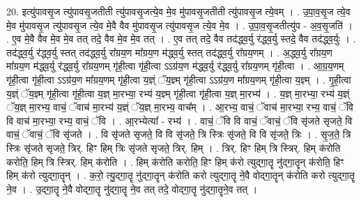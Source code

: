 \documentclass[17pt]{extarticle}
\begin{document}
20. इत्यु॑पावसृ॒ज त्यु॑पावसृ॒जतीती त्यु॑पावसृ॒जत्ये॒व मे॒व मु॑पावसृ॒जतीती त्यु॑पावसृ॒ज त्ये॒वम् । . उ॒पा॒व॒सृ॒ज त्ये॒व मे॒व मु॑पावसृ॒ज त्यु॑पावसृ॒ज त्ये॒व मे॒वै वैव मु॑पावसृ॒ज त्यु॑पावसृ॒ज त्ये॒व मे॒व । . उ॒पा॒व॒सृ॒जतीत्यु॑प - अ॒व॒सृ॒जति॑ । . ए॒व मे॒वै वैव मे॒व मे॒व तत् तदे॒ वैव मे॒व मे॒व तत् । . ए॒व तत् तदे॒ वैव तद॑द्ध्व॒र्यु र॑द्ध्व॒र्यु स्तदे॒ वैव तद॑द्ध्व॒र्युः । . तद॑द्ध्व॒र्यु र॑द्ध्व॒र्यु स्तत् तद॑द्ध्व॒र्यु रा᳚ग्रय॒ण मा᳚ग्रय॒ण म॑द्ध्व॒र्यु स्तत् तद॑द्ध्व॒र्यु रा᳚ग्रय॒णम् । . अ॒द्ध्व॒र्यु रा᳚ग्रय॒ण मा᳚ग्रय॒ण म॑द्ध्व॒र्यु र॑द्ध्व॒र्यु रा᳚ग्रय॒णम् गृ॑ही॒त्वा गृ॑ही॒त्वा ऽऽग्र॑य॒ण म॑द्ध्व॒र्यु र॑द्ध्व॒र्यु रा᳚ग्रय॒णम् गृ॑ही॒त्वा । . आ॒ग्र॒य॒णम् गृ॑ही॒त्वा गृ॑ही॒त्वा ऽऽग्र॑य॒ण मा᳚ग्रय॒णम् गृ॑ही॒त्वा य॒ज्ञ्ं ॅय॒ज्ञ्म् गृ॑ही॒त्वा ऽऽग्र॑य॒ण मा᳚ग्रय॒णम् गृ॑ही॒त्वा य॒ज्ञ्म् । . गृ॒ही॒त्वा य॒ज्ञ्ं ॅय॒ज्ञ्म् गृ॑ही॒त्वा गृ॑ही॒त्वा य॒ज्ञ् मा॒रभ्या॒ रभ्य॑ य॒ज्ञ्म् गृ॑ही॒त्वा गृ॑ही॒त्वा य॒ज्ञ् मा॒रभ्य॑ । . य॒ज्ञ् मा॒रभ्या॒ रभ्य॑ य॒ज्ञ्ं ॅय॒ज्ञ् मा॒रभ्य॒ वाचं॒ ॅवाच॑ मा॒रभ्य॑ य॒ज्ञ्ं ॅय॒ज्ञ् मा॒रभ्य॒ वाच᳚म् । . आ॒रभ्य॒ वाचं॒ ॅवाच॑ मा॒रभ्या॒ रभ्य॒ वाचं॒ ॅवि वि वाच॑ मा॒रभ्या॒ रभ्य॒ वाचं॒ ॅवि । . आ॒रभ्येत्या᳚ - रभ्य॑ । . वाचं॒ ॅवि वि वाचं॒ ॅवाचं॒ ॅवि सृ॑जते सृजते॒ वि वाचं॒ ॅवाचं॒ ॅवि सृ॑जते । . वि सृ॑जते सृजते॒ वि वि सृ॑जते॒ त्रि स्त्रिः सृ॑जते॒ वि वि सृ॑जते॒ त्रिः । . सृ॒ज॒ते॒ त्रि स्त्रिः सृ॑जते सृजते॒ त्रिर्. हिꣳ हिम् त्रिः सृ॑जते सृजते॒ त्रिर्. हिम् । . त्रिर्. हिꣳ हिम् त्रि स्त्रिर्. हिम् क॑रोति करोति॒ हिम् त्रि स्त्रिर्. हिम् क॑रोति । . हिम् क॑रोति करोति॒ हिꣳ हिम् क॑रो त्युद्‌गा॒तॄ नु॑द्‌गा॒तॄन् क॑रोति॒ हिꣳ हिम् क॑रो त्युद्‌गा॒तॄन् । . क॒रो॒ त्यु॒द्‌गा॒तॄ नु॑द्‌गा॒तॄन् क॑रोति करो त्युद्‌गा॒तॄ ने॒वै वोद्‌गा॒तॄन् क॑रोति करो त्युद्‌गा॒तॄ ने॒व । . उ॒द्‌गा॒तॄ ने॒वै वोद्‌गा॒तॄ नु॑द्‌गा॒तॄ ने॒व तत् तदे॒ वोद्‌गा॒तॄ नु॑द्‌गा॒तॄने॒व तत् । \newline
\end{document}
